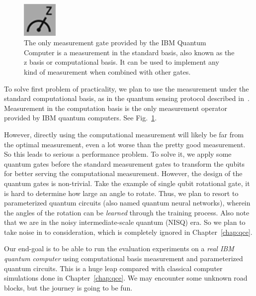 \begin{figure}[ht]
    \centering
    \includegraphics[width=0.15\textwidth]{figures/measurement-gate.png}
    \caption{The only measurement gate provided by the IBM Quantum Computer is a measurement in the standard basis, 
             also known as the z basis or computational basis. It can be used to implement any kind of measurement
             when combined with other gates.}
    \label{fig:measurement}
\end{figure}

To solve first problem of practicality, we plan to use the measurement under the standard computational basis, 
as in the quantum sensing protocol described in~\cite{RevModPhys.quantumsensing}.
Measurement in the computation basis is the only measurement operator provided by IBM quantum computers. See Fig.~\ref{fig:measurement}.

However, directly using the computational measurement will likely be far from the optimal measurement, even a lot worse than the pretty good measurement.
So this leads to serious a performance problem.
To solve it, we apply some quantum gates before the standard measurement gates to transform the qubits for better serving the computational measurement.
However, the design of the quantum gates is non-trivial. Take the example of single qubit rotational gate, it is hard to determine how large an angle to rotate.
Thus, we plan to resort to parameterized quantum circuits (also named quantum neural networks), wherein the angles of the rotation can be \textit{learned} through the training process.
Also note that we are in the noisy intermediate-scale quantum (NISQ) era. So we plan to take noise in to consideration, which is completely ignored in Chapter~\ref{chap:qce}.

Our end-goal is to be able to run the evaluation experiments on a \textit{real IBM quantum computer} using computational basis measurement and parameterized quantum circuits.
This is a huge leap compared with classical computer simulations done in Chapter~\ref{chap:qce}. 
We may encounter some unknown road blocks, but the journey is going to be fun.
